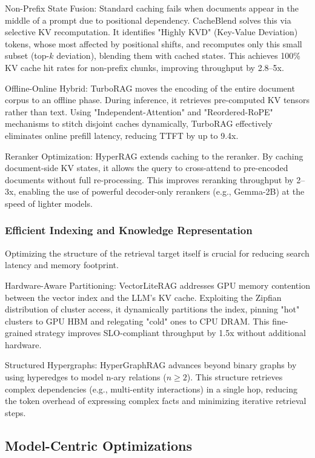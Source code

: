 \documentclass[11pt]{article}
\begin{document}
Non-Prefix State Fusion: Standard caching fails when documents appear in the middle of a prompt due to positional dependency. CacheBlend \citep{yao2025cacheblend} solves this via selective KV recomputation. It identifies "Highly KVD" (Key-Value Deviation) tokens, whose most affected by positional shifts, and recomputes only this small subset (top-$k$ deviation), blending them with cached states. This achieves 100\% KV cache hit rates for non-prefix chunks, improving throughput by 2.8–5x.

Offline-Online Hybrid: TurboRAG \citep{lu2025turborag} moves the encoding of the entire document corpus to an offline phase. During inference, it retrieves pre-computed KV tensors rather than text. Using "Independent-Attention" and "Reordered-RoPE" mechanisms to stitch disjoint caches dynamically, TurboRAG effectively eliminates online prefill latency, reducing TTFT by up to 9.4x.

Reranker Optimization: HyperRAG \citep{an2025hyperrag} extends caching to the reranker. By caching document-side KV states, it allows the query to cross-attend to pre-encoded documents without full re-processing. This improves reranking throughput by 2–3x, enabling the use of powerful decoder-only rerankers (e.g., Gemma-2B) at the speed of lighter models.

\subsubsection{Efficient Indexing and Knowledge Representation}
Optimizing the structure of the retrieval target itself is crucial for reducing search latency and memory footprint.

Hardware-Aware Partitioning: VectorLiteRAG \citep{kim2025adaptive} addresses GPU memory contention between the vector index and the LLM's KV cache. Exploiting the Zipfian distribution of cluster access, it dynamically partitions the index, pinning "hot" clusters to GPU HBM and relegating "cold" ones to CPU DRAM. This fine-grained strategy improves SLO-compliant throughput by 1.5x without additional hardware.

Structured Hypergraphs: HyperGraphRAG \citep{luo2025hypergraphrag} advances beyond binary graphs by using hyperedges to model n-ary relations ($n \ge 2$). This structure retrieves complex dependencies (e.g., multi-entity interactions) in a single hop, reducing the token overhead of expressing complex facts and minimizing iterative retrieval steps.

\subsection{Model-Centric Optimizations}
\end{document}
